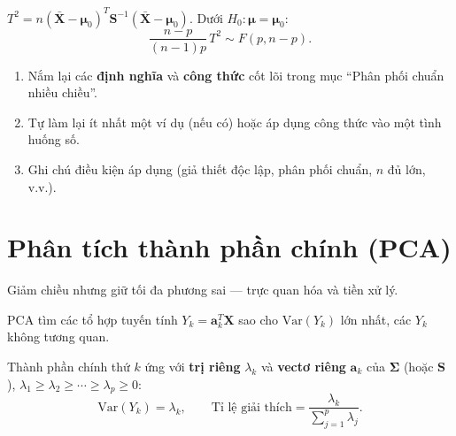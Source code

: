 \documentclass[12pt,a4paper]{article}
\begin{document}
\begin{dinhly}[title={Hotelling $T^2$}]
  $T^2 = n(\bar{\mathbf{X}} - \boldsymbol{\mu}_0)^T \mathbf{S}^{-1}(\bar{\mathbf{X}} - \boldsymbol{\mu}_0)$. Dưới $H_0: \boldsymbol{\mu} = \boldsymbol{\mu}_0$:
  \[
    \frac{n - p}{(n-1)p}\,T^2 \sim F(p, n-p).
  \]
\end{dinhly}


\begin{tongket}[title={Tổng kết: Phân phối chuẩn nhiều chiều}]
\begin{enumerate}
  \item Nắm lại các \textbf{định nghĩa} và \textbf{công thức} cốt lõi trong mục ``Phân phối chuẩn nhiều chiều''.
  \item Tự làm lại ít nhất một ví dụ (nếu có) hoặc áp dụng công thức vào một tình huống số.
  \item Ghi chú điều kiện áp dụng (giả thiết độc lập, phân phối chuẩn, $n$ đủ lớn, v.v.).
\end{enumerate}
\end{tongket}

\section{Phân tích thành phần chính (PCA)}

\begin{dongco}[title={Động cơ --- Phân tích thành phần chính (PCA)}]
Giảm chiều nhưng giữ tối đa phương sai --- trực quan hóa và tiền xử lý.
\end{dongco}

\begin{dinhnghia}
  PCA tìm các tổ hợp tuyến tính $Y_k = \mathbf{a}_k^T \mathbf{X}$ sao cho $\text{Var}(Y_k)$ lớn nhất, các $Y_k$ không tương quan.
\end{dinhnghia}

\begin{dinhly}
  Thành phần chính thứ $k$ ứng với \textbf{trị riêng} $\lambda_k$ và \textbf{vectơ riêng} $\mathbf{a}_k$ của $\boldsymbol{\Sigma}$ (hoặc $\mathbf{S}$), $\lambda_1 \ge \lambda_2 \ge \cdots \ge \lambda_p \ge 0$:
  \[
    \text{Var}(Y_k) = \lambda_k, \qquad \text{Tỉ lệ giải thích} = \frac{\lambda_k}{\sum_{j=1}^p \lambda_j}.
  \]
\end{dinhly}
\end{document}
